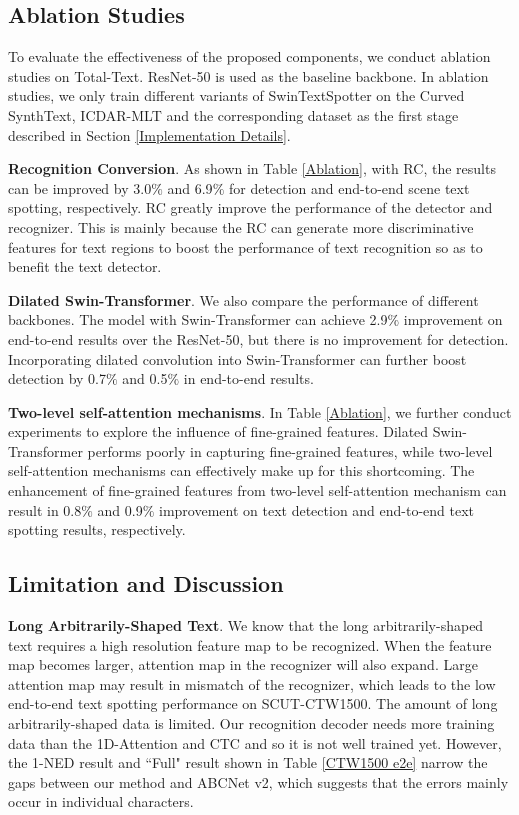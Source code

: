 \documentclass[10pt,twocolumn,letterpaper]{article}
\begin{document}
\subsection{Ablation Studies}
To evaluate the effectiveness of the proposed components, we conduct ablation studies on Total-Text. ResNet-50 is used as the baseline backbone. 
In ablation studies, we only train different variants of SwinTextSpotter on the Curved SynthText, ICDAR-MLT and the corresponding dataset as the first stage described in Section \ref{Implementation Details}.


\textbf{Recognition Conversion}. As shown in Table \ref{Ablation}, with RC, the results can be improved by 3.0$\%$ and 6.9$\%$ for detection and end-to-end scene text spotting, respectively. RC greatly improve the performance of the detector and recognizer. This is mainly because the RC can generate more discriminative features for text regions to boost the performance of text recognition so as to benefit the text detector.


\textbf{Dilated Swin-Transformer}. We also compare the performance of different backbones. The model with Swin-Transformer can achieve 2.9$\%$ improvement on end-to-end results over the ResNet-50, but there is no improvement for detection. Incorporating dilated convolution into Swin-Transformer can further boost detection by 0.7$\%$ and 0.5$\%$ in end-to-end results.


\textbf{Two-level self-attention mechanisms}. 
In Table \ref{Ablation}, we further conduct experiments to explore the influence of fine-grained features. 
Dilated Swin-Transformer performs poorly in capturing fine-grained features, while two-level self-attention mechanisms can effectively make up for this shortcoming. The enhancement of fine-grained features from two-level self-attention mechanism can result in 0.8$\%$ and 0.9$\%$ improvement on text detection and end-to-end text spotting results, respectively.


\subsection{Limitation and Discussion}
\label{subsec:discuss}
\textbf{Long Arbitrarily-Shaped Text}. We know that the long arbitrarily-shaped text requires a high resolution feature map to be recognized. When the feature map becomes larger, attention map in the recognizer will also expand. 
Large attention map may result in mismatch of the recognizer, which leads to the low end-to-end text spotting performance on SCUT-CTW1500. The amount of long arbitrarily-shaped data is limited. Our recognition decoder needs more training data than the 1D-Attention\cite{bahdanau2014neural} and CTC\cite{graves2006connectionist} and so it is not well trained yet.
However, the 1-NED result and ``Full" result shown in Table \ref{CTW1500 e2e} narrow the gaps between our method and ABCNet v2, which suggests that the errors mainly occur in individual characters.
\end{document}
